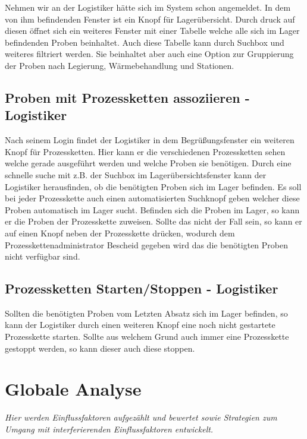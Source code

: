\documentclass[enabledeprecatedfontcommands,fontsize=12pt,paper=a4,twoside]{scrartcl}
\begin{document}
Nehmen wir an der Logistiker hätte sich im System schon angemeldet.
In dem von ihm befindenden Fenster ist ein Knopf für Lagerübersicht. Durch druck auf diesen öffnet sich ein weiteres Fenster mit einer Tabelle welche alle sich im Lager befindenden Proben beinhaltet. Auch diese Tabelle kann durch Suchbox und weiteres filtriert werden. Sie beinhaltet aber auch eine Option zur Gruppierung der Proben nach Legierung, Wärmebehandlung und Stationen.

\subsection{Proben mit Prozessketten assoziieren - Logistiker}

Nach seinem Login findet der Logistiker in dem Begrüßungsfenster ein weiteren Knopf für Prozessketten. Hier kann er die verschiedenen Prozessketten sehen welche gerade ausgeführt werden und welche Proben sie benötigen. Durch eine schnelle suche mit z.B. der Suchbox im Lagerübersichtsfenster kann der Logistiker herausfinden, ob die benötigten Proben sich im Lager befinden. Es soll bei jeder Prozesskette auch einen automatisierten Suchknopf geben welcher diese Proben automatisch im Lager sucht.
Befinden sich die Proben im Lager, so kann er die Proben der Prozesskette zuweisen. Sollte das nicht der Fall sein, so kann er auf einen Knopf neben der Prozesskette drücken, wodurch dem Prozesskettenadministrator Bescheid gegeben wird das die benötigten Proben nicht verfügbar sind.
 
\subsection{Prozessketten Starten/Stoppen - Logistiker}

Sollten die benötigten Proben vom Letzten Absatz sich im Lager befinden, so kann der Logistiker durch einen weiteren Knopf eine noch nicht gestartete Prozesskette starten.
Sollte aus welchem Grund auch immer eine Prozesskette gestoppt werden, so kann dieser auch diese stoppen.

\section{Globale Analyse}

\label{sec:globale_analyse}

{\it Hier werden Einflussfaktoren aufgezählt und bewertet sowie Strategien
zum Umgang mit interferierenden Einflussfaktoren entwickelt.}
\end{document}
